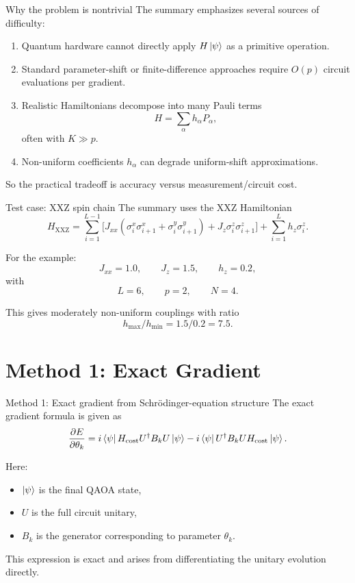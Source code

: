 \documentclass[aspectratio=169]{beamer}
\begin{document}
\begin{frame}{Why the problem is nontrivial}
The summary emphasizes several sources of difficulty:
\begin{enumerate}
\item Quantum hardware cannot directly apply \(H\ket{\psi}\) as a primitive operation.
\item Standard parameter-shift or finite-difference approaches require \(O(p)\) circuit evaluations per gradient.
\item Realistic Hamiltonians decompose into many Pauli terms
\[
H=\sum_\alpha h_\alpha P_\alpha,
\]
often with \(K\gg p\).
\item Non-uniform coefficients \(h_\alpha\) can degrade uniform-shift approximations.
\end{enumerate}
So the practical tradeoff is accuracy versus measurement/circuit cost.
\end{frame}

\begin{frame}{Test case: XXZ spin chain}
The summary uses the XXZ Hamiltonian
\[
H_{\mathrm{XXZ}}
=
\sum_{i=1}^{L-1}
\Big[
J_{xx}(\sigma_i^x\sigma_{i+1}^x+\sigma_i^y\sigma_{i+1}^y)
+J_z \sigma_i^z\sigma_{i+1}^z
\Big]
+
\sum_{i=1}^{L} h_z \sigma_i^z.
\]

For the example:
\[
J_{xx}=1.0,\qquad J_z=1.5,\qquad h_z=0.2,
\]
with
\[
L=6,\qquad p=2,\qquad N=4.
\]

This gives moderately non-uniform couplings with ratio
\[
h_{\max}/h_{\min}=1.5/0.2=7.5.
\]
\end{frame}

\section{Method 1: Exact Gradient}

\begin{frame}{Method 1: Exact gradient from Schr\"odinger-equation structure}
The exact gradient formula is given as
\[
\frac{\partial E}{\partial \theta_k}
=
i\bra{\psi}H_{\text{cost}}U^\dagger B_k U\ket{\psi}
-
i\bra{\psi}U^\dagger B_k U H_{\text{cost}}\ket{\psi}.
\]

Here:
\begin{itemize}
\item \(\ket{\psi}\) is the final QAOA state,
\item \(U\) is the full circuit unitary,
\item \(B_k\) is the generator corresponding to parameter \(\theta_k\).
\end{itemize}

This expression is exact and arises from differentiating the unitary evolution directly.
\end{frame}
\end{document}
